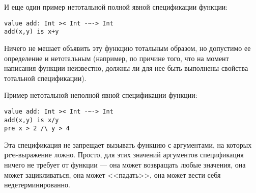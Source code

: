 И еще один пример нетотальной полной явной спецификации функции:
\begin{lstlisting}
value add: Int >< Int -~-> Int
add(x,y) is x+y
\end{lstlisting}
Ничего не мешает объявить эту функцию тотальным образом, но допустимо ее определение и нетотальным (например, по причине того, что на момент написания функции неизвестно, должны ли для нее быть выполнены свойства тотальной спецификации).

Пример нетотальной неполной явной спецификации функции:
\begin{lstlisting}
value add: Int >< Int -~-> Int
add(x,y) is x/y
pre x > 2 /\ y > 4
\end{lstlisting}

Эта спецификация не запрещает вызывать функцию с аргументами, на которых \textbf{pre}-выражение ложно. Просто, для этих значений аргументов спецификация ничего не требует от функции --- она может возвращать любые значения, она может зацикливаться, она может <<падать>>, она может вести себя недетерминированно. 